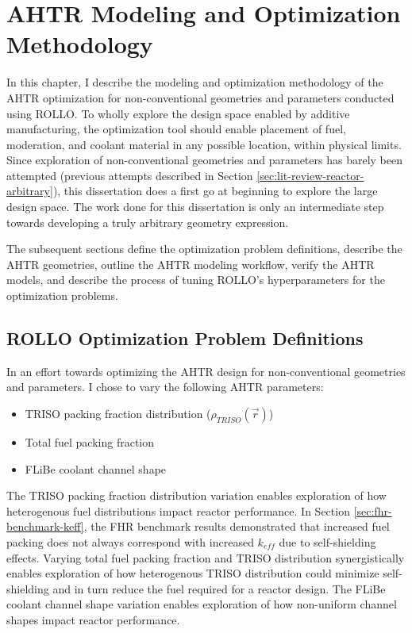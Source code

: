 \chapter{AHTR Modeling and Optimization Methodology}
\label{chap:method}
In this chapter, I describe the modeling and optimization methodology of the 
\acrfull{AHTR} optimization for non-conventional geometries and parameters
conducted using \acrfull{ROLLO}.
To wholly explore the design space enabled by additive manufacturing, the 
optimization tool should enable placement of fuel, moderation, and coolant material 
in any possible location, within physical limits. 
Since exploration of non-conventional geometries and parameters has barely been
attempted (previous attempts described in Section \ref{sec:lit-review-reactor-arbitrary}), 
this dissertation does a first go at beginning to explore the large design space.  
The work done for this dissertation is only an intermediate step towards developing 
a truly arbitrary geometry expression. 

The subsequent sections define the optimization problem definitions, describe the 
\gls{AHTR} geometries, outline the \gls{AHTR} modeling workflow, verify the \gls{AHTR} 
models, and describe the process of tuning \gls{ROLLO}'s hyperparameters for the optimization 
problems.

\section{ROLLO Optimization Problem Definitions}
\label{sec:opt-problem}
In an effort towards optimizing the \gls{AHTR} design for non-conventional geometries 
and parameters.
I chose to vary the following \gls{AHTR} parameters: 
\begin{itemize}
    \item \gls{TRISO} packing fraction distribution
    ($\rho_{TRISO}(\vec{r})$)
    \item Total fuel packing fraction
    \item \gls{FLiBe} coolant channel shape 
\end{itemize} 
The TRISO packing fraction distribution variation enables exploration of how 
heterogenous fuel distributions impact reactor performance.
In Section \ref{sec:fhr-benchmark-keff}, the \gls{FHR} benchmark results demonstrated that 
increased fuel packing does not always correspond with increased $k_{eff}$ due to 
self-shielding effects. 
Varying total fuel packing fraction and TRISO distribution synergistically enables exploration of
how heterogenous TRISO distribution could minimize self-shielding and in turn reduce the fuel 
required for a reactor design. 
The \gls{FLiBe} coolant channel shape variation enables exploration of how non-uniform 
channel shapes impact reactor performance. 

